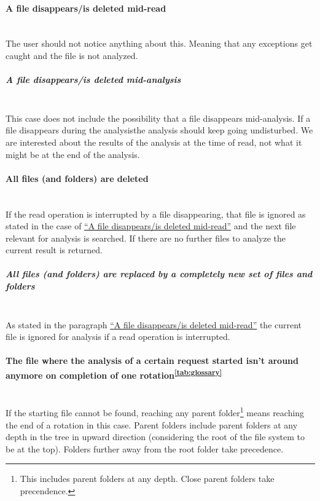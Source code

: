 \documentclass[11pt]{article} %
\begin{document}
    \paragraph{A file disappears/is deleted mid-read}\label{par:file_disappear} ~\\
    The user should not notice anything about this. Meaning that any exceptions get caught and the file is not analyzed.


    \subparagraph{A file disappears/is deleted mid-analysis} ~\\
    This case does not include the possibility that a file disappears mid-analysis. If a file disappears during the analysisthe analysis should keep going undisturbed. We are interested about the results of the analysis at the time of read, not what it might be at the end of the analysis.


    \paragraph{All files (and folders) are deleted}\label{par:everything_deleted} ~\\
    If the read operation is interrupted by a file disappearing, that file is ignored as stated in the case of \hyperref[par:file_disappear]{``A file disappears/is deleted mid-read''} and the next file relevant for analysis is searched. If there are no further files to analyze the current result is returned.


    \subparagraph{All files (and folders) are replaced by a completely new set of files and folders} ~\\
    As stated in the paragraph \hyperref[par:file_disappear]{``A file disappears/is deleted mid-read''} the current file is ignored for analysis if a read operation is interrupted.


    \paragraph{The file where the analysis of a certain request started isn't around anymore on completion of one rotation\textsuperscript{\ref{tab:glossary}}} ~\\
    If the starting file cannot be found, reaching any parent folder\footnote{This includes parent folders at any depth. Close parent folders take precendence.} means reaching the end of a rotation in this case. Parent folders include parent folders at any depth in the tree in upward direction (considering the root of the file system to be at the top). Folders further away from the root folder take precedence.
\end{document}
